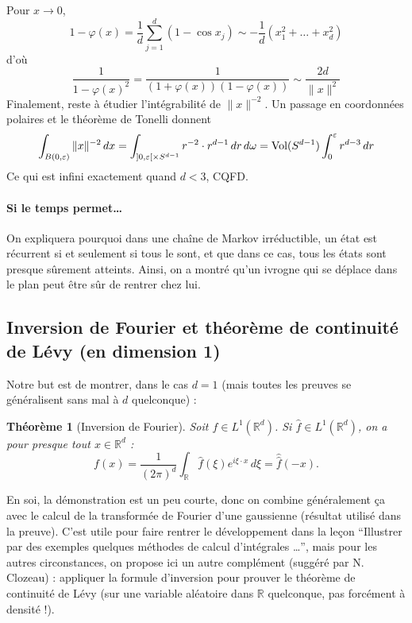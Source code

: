 \documentclass[a4paper, 11pt]{article}
\def\R{\mathbb{R}}
\newtheorem*{theorem}{Théorème}
\begin{document}
Pour $x \to 0$,
\[ 1 - \varphi(x) = \frac{1}{d} \sum_{j=1}^d (1 - \cos x_j) \sim
  -\frac{1}{d}(x_1^2 + \ldots + x_d^2) \] d'où
\[\frac{1}{1 - \varphi(x)^2} = \frac{1}{(1 + \varphi(x))(1 - \varphi(x))} \sim
  \frac{2d}{\|x\|^2} \]
Finalement, reste à étudier l'intégrabilité de $\|x\|^{-2}$. Un passage en
coordonnées polaires et le théorème de Tonelli donnent
\[ \int_{B(0,\varepsilon)} \|x\|^{-2}\,dx = \int_{]0,\varepsilon[ \times S^{d-1}}
  r^{-2} \cdot r^{d-1}\,dr\,d\omega = \textnormal{Vol}(S^{d-1}) \int_0^\varepsilon
  r^{d-3}\,dr \]
Ce qui est infini exactement quand $d < 3$, CQFD.

\paragraph{Si le temps permet…} On expliquera pourquoi dans une chaîne de Markov
irréductible, un état est récurrent si et seulement si tous le sont, et que dans
ce cas, tous les états sont presque sûrement atteints. Ainsi, on a montré qu'un
ivrogne qui se déplace dans le plan peut être sûr de rentrer chez lui.

\newpage

\subsection{Inversion de Fourier et théorème de continuité de Lévy (en dimension 1)}

Notre but est de montrer, dans le cas $d = 1$ (mais toutes les preuves se
généralisent sans mal à $d$ quelconque) :

\begin{theorem}[Inversion de Fourier]
  Soit $f \in L^1(\R^d)$. Si $\hat{f} \in L^1(\R^d)$, on a pour presque
  tout $x \in \R^d$ :
\[ f(x) = \frac{1}{(2\pi)^d} \int_\R \hat{f}(\xi) e^{i\xi \cdot x} \,d\xi =
  \hat{\hat{f}}(-x). \]
\end{theorem}

En soi, la démonstration est un peu courte, donc on combine généralement ça avec
le calcul de la transformée de Fourier d'une gaussienne (résultat utilisé dans
la preuve). C'est utile pour faire rentrer le développement dans la leçon
\enquote{Illustrer par des exemples quelques méthodes de calcul d'intégrales …},
mais pour les autres circonstances, on propose ici un autre complément (suggéré
par N. Clozeau) : appliquer la formule d'inversion pour prouver le théorème de
continuité de Lévy (sur une variable aléatoire dans $\R$ quelconque, pas
forcément à densité !).
\end{document}
